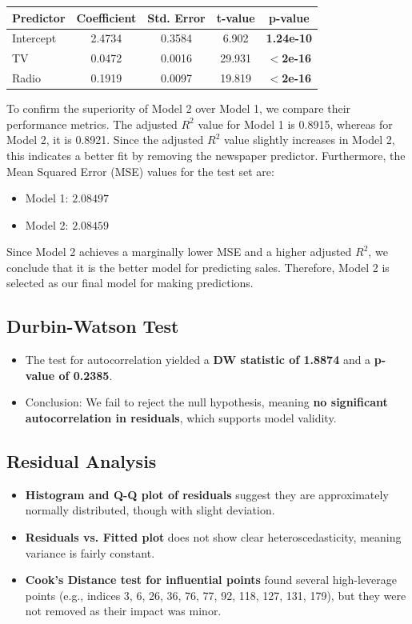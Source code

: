 \documentclass{article}
\begin{document}
\begin{table}[h]
    \centering
    \begin{tabular}{lcccc}
        \toprule
        Predictor  & Coefficient & Std. Error & t-value & p-value \\
        \midrule
        Intercept  & 2.4734      & 0.3584     & 6.902   & \textbf{1.24e-10} \\
        TV         & 0.0472      & 0.0016     & 29.931  & \textbf{$<$2e-16} \\
        Radio      & 0.1919      & 0.0097     & 19.819  & \textbf{$<$2e-16} \\
        \bottomrule
    \end{tabular}
\end{table}
\newpage
To confirm the superiority of Model 2 over Model 1, we compare their performance metrics. The adjusted $R^2$ value for Model 1 is 0.8915, whereas for Model 2, it is 0.8921. Since the adjusted $R^2$ value slightly increases in Model 2, this indicates a better fit by removing the newspaper predictor. Furthermore, the Mean Squared Error (MSE) values for the test set are:

\begin{itemize}
    \item Model 1: $2.08497$
    \item Model 2: $2.08459$
\end{itemize}

Since Model 2 achieves a marginally lower MSE and a higher adjusted $R^2$, we conclude that it is the better model for predicting sales. Therefore, Model 2 is selected as our final model for making predictions.

\subsection{Durbin-Watson Test}
\begin{itemize}
    \item The test for autocorrelation yielded a \textbf{DW statistic of 1.8874} and a \textbf{p-value of 0.2385}.
    \item Conclusion: We fail to reject the null hypothesis, meaning \textbf{no significant autocorrelation in residuals}, which supports model validity.
\end{itemize}

\subsection{Residual Analysis}
\begin{itemize}
    \item \textbf{Histogram and Q-Q plot of residuals} suggest they are approximately normally distributed, though with slight deviation.
    \item \textbf{Residuals vs. Fitted plot} does not show clear heteroscedasticity, meaning variance is fairly constant.
    \item \textbf{Cook’s Distance test for influential points} found several high-leverage points (e.g., indices 3, 6, 26, 36, 76, 77, 92, 118, 127, 131, 179), but they were not removed as their impact was minor.
\end{itemize}
\end{document}
